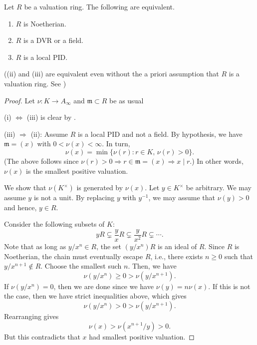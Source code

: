 \documentclass[12pt]{article}
\begin{document}
\begin{prop} \label{prop:valuation-noetherian}
	Let $R$ be a valuation ring. The following are equivalent.
	\begin{enumerate}[label=(\roman*)]
		\item $R$ is Noetherian.
		\item $R$ is a DVR or a field.
		\item $R$ is a local PID.
	\end{enumerate}
	((ii) and (iii) are equivalent even without the a priori assumption that $R$ is a valuation ring. See )
\end{prop}
\begin{proof} 
	Let $\nu : K \to A_{\infty}$ and $\mathfrak{m} \subset R$ be as usual

	(i) $\Leftrightarrow$ (iii) is clear by .

	(iii) $\Rightarrow$ (ii): Assume $R$ is a local PID and not a field. \newline
	By hypothesis, we have $\mathfrak{m} = (x)$ with $0 < \nu(x) < \infty$. In turn,
	\begin{equation*} 
		\nu(x) = \min\{\nu(r) : r \in K,\, \nu(r) > 0\}.
	\end{equation*}
	(The above follows since $\nu(r) > 0 \Rightarrow r \in \mathfrak{m} = (x) \Rightarrow x \mid r$.) \newline
	In other words, $\nu(x)$ is the smallest positive valuation.

	We show that $\nu(K^{\times})$ is generated by $\nu(x)$. Let $y \in K^{\times}$ be arbitrary. We may assume $y$ is not a unit. By replacing $y$ with $y^{-1}$, we may assume that $\nu(y) > 0$ and hence, $y \in R$. 

	Consider the following subsets of $K$:
	\begin{equation*} 
		y R \subsetneq \frac{y}{x} R \subsetneq \frac{y}{x^{2}} R \subsetneq \cdots.
	\end{equation*}
	Note that as long as $y/x^{n} \in R$, the set $(y/x^{n}) R$ is an ideal of $R$. Since $R$ is Noetherian, the chain must eventually escape $R$, i.e., there exists $n \ge 0$ such that $y/x^{n + 1} \notin R$. Choose the smallest such $n$. Then, we have
	\begin{equation*} 
		\nu(y/x^{n}) \ge 0 > \nu(y/x^{n + 1}).
	\end{equation*}
	If $\nu(y/x^{n}) = 0$, then we are done since we have $\nu(y) = n \nu(x)$. If this is not the case, then we have strict inequalities above, which gives
	\begin{equation*} 
		\nu(y/x^{n}) > 0 > \nu(y/x^{n + 1}).
	\end{equation*}
	Rearranging gives
	\begin{equation*} 
		\nu(x) > \nu(x^{n + 1}/y) > 0.
	\end{equation*}
	But this contradicts that $x$ had smallest positive valuation.


\end{proof}
\end{document}
